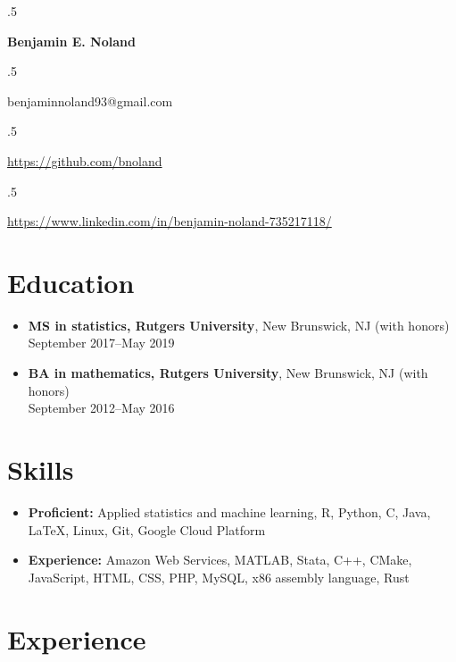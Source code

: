 \documentclass[letterpaper,12pt]{article}
\begin{document}
\moveleft.5\hoffset\centerline{\Large\bf Benjamin E. Noland}
\smallskip
\moveleft.5\hoffset\centerline{benjaminnoland93@gmail.com}
\moveleft.5\hoffset\centerline{\url{https://github.com/bnoland}}
\moveleft.5\hoffset\centerline{\url{https://www.linkedin.com/in/benjamin-noland-735217118/}}

\section*{Education}

\begin{itemize}
\item \textbf{MS in statistics, Rutgers University}, New Brunswick, NJ
  (with honors) \\
  September 2017--May 2019

\item \textbf{BA in mathematics, Rutgers University}, New Brunswick, NJ
  (with honors) \\
  September 2012--May 2016
\end{itemize}

\section*{Skills}
\begin{itemize}
	\item \textbf{Proficient:} Applied statistics and machine learning, R, 
	Python, C, Java, \LaTeX, Linux, Git, Google Cloud Platform
	\item \textbf{Experience:} Amazon Web Services, MATLAB, Stata, C++, CMake,
  JavaScript, HTML, CSS, PHP, MySQL, x86 assembly language, Rust
\end{itemize}

\section*{Experience}
\end{document}
